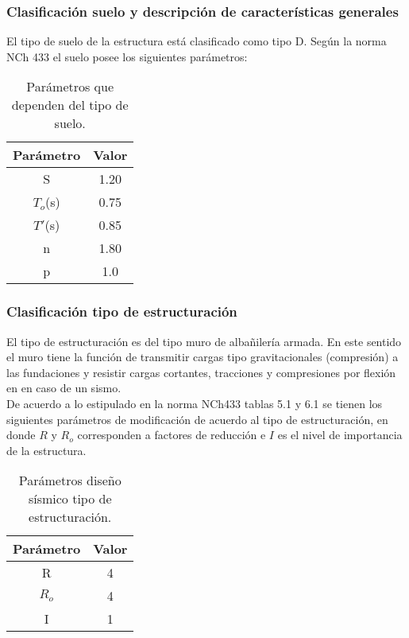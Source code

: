     \subsubsection{Clasificación suelo y descripción de características generales}
    
    El tipo de suelo de la estructura está clasificado como tipo D. Según la norma NCh 433 el suelo posee los siguientes parámetros:

    \begin{table}[H]
      \centering
      \caption{Parámetros que dependen del tipo de suelo.}
        \begin{tabular}{|c|c|}
        \hline
        \textbf{Parámetro} & \textbf{Valor} \bigstrut\\
        \hline
        S     & 1.20 \bigstrut[t]\\
        $T_o$(s) & 0.75 \\
        $T'$(s) & 0.85 \\
        n     & 1.80 \\
        p     & 1.0 \bigstrut[b]\\
        \hline
        \end{tabular}%
    \end{table}%
    
    \subsubsection{Clasificación tipo de estructuración}
    
    El tipo de estructuración es del tipo muro de albañilería armada. En este sentido el muro tiene la función de transmitir cargas tipo gravitacionales (compresión) a las fundaciones y resistir cargas cortantes, tracciones y compresiones por flexión en en caso de un sismo. \\

    De acuerdo a lo estipulado en la norma NCh433 tablas 5.1 y 6.1 se tienen los siguientes parámetros de modificación de acuerdo al tipo de estructuración, en donde $R$ y $R_o$ corresponden a factores de reducción e $I$ es el nivel de importancia de la estructura.
    
    \begin{table}[H]
      \centering
      \caption{Parámetros diseño sísmico tipo de estructuración.}
        \begin{tabular}{|c|c|}
        \hline
        \textbf{Parámetro} & \textbf{Valor} \bigstrut\\
        \hline
        R     & 4 \bigstrut\\
        \hline
        $R_o$ & 4 \bigstrut\\
        \hline
        I     & 1 \bigstrut\\
        \hline
        \end{tabular}%
    \end{table}%

